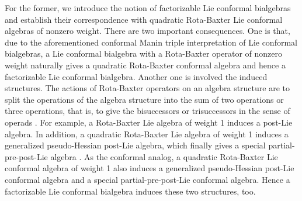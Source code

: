\documentclass[12pt]{amsart}
\begin{document}
   For the former, we introduce the notion of factorizable Lie conformal bialgebras and establish their correspondence with quadratic Rota-Baxter Lie conformal algebras of nonzero
   weight. There are two important consequences. One is that, due
   to the aforementioned conformal Manin triple interpretation of
   Lie conformal bialgebras, a Lie conformal bialgebra with a Rota-Baxter operator of nonzero
   weight naturally gives a quadratic Rota-Baxter conformal
   algebra and hence a factorizable Lie conformal bialgebra.
   Another one is involved the induced structures. The actions of
   Rota-Baxter operators on an algebra structure are to split the operations
   of the algebra structure into the sum of two operations or
   three operations, that is, to give the bisuccessors or
   trisuccessors in the sense of operads \cite{BBGN}. For example,
a Rota-Baxter Lie algebra of  weight 1 induces a
   post-Lie algebra. In addition,
a quadratic Rota-Baxter Lie algebra of weight 1 induces a
generalized pseudo-Hessian post-Lie algebra, which finally gives a
special partial-pre-post-Lie algebra \cite{LBG}. As the conformal
analog, a quadratic Rota-Baxter Lie conformal algebra of
   weight 1 also induces  a generalized
pseudo-Hessian post-Lie conformal algebra and a special
partial-pre-post-Lie conformal algebra. Hence a factorizable Lie
conformal bialgebra induces these two structures, too.


\end{document}
